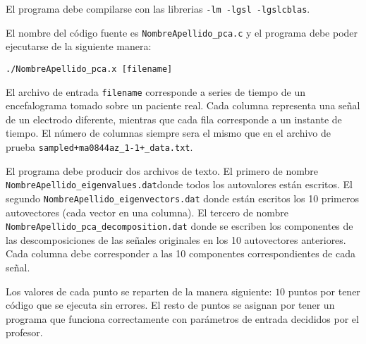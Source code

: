 \documentclass{article}
\begin{document}
\begin{enumerate}
El programa debe compilarse con las librerias \verb"-lm -lgsl -lgslcblas".

El nombre del c\'odigo fuente es \verb"NombreApellido_pca.c" y el
programa debe poder ejecutarse de la siguiente manera: 

\begin{verbatim}
./NombreApellido_pca.x [filename]
\end{verbatim}

El archivo de entrada \verb"filename" corresponde a series de tiempo
de un encefalograma tomado sobre un paciente real. Cada columna
representa una se\~nal de un electrodo diferente, mientras que cada
fila corresponde a un instante de tiempo. El n\'umero de columnas
siempre sera el mismo que en el archivo de prueba   \verb"sampled+ma0844az_1-1+_data.txt".  

El programa debe producir dos archivos de texto. El primero de nombre
\verb"NombreApellido_eigenvalues.dat"donde todos los autovalores
est\'an escritos. El segundo \verb"NombreApellido_eigenvectors.dat"
donde est\'an escritos los 10 primeros autovectores (cada vector en una
columna). El tercero de nombre
\verb"NombreApellido_pca_decomposition.dat" donde se escriben los
componentes de las descomposiciones de las se\~nales originales en los
10 autovectores anteriores. Cada columna debe corresponder a las 10
componentes correspondientes de cada se\~nal. 

\end{enumerate}

Los valores de cada punto se reparten de la manera siguiente: $10$ puntos por tener c\'odigo que se ejecuta sin errores. El resto de puntos se asignan por tener un programa que funciona correctamente con par\'ametros de entrada decididos por el profesor.
\end{document}
